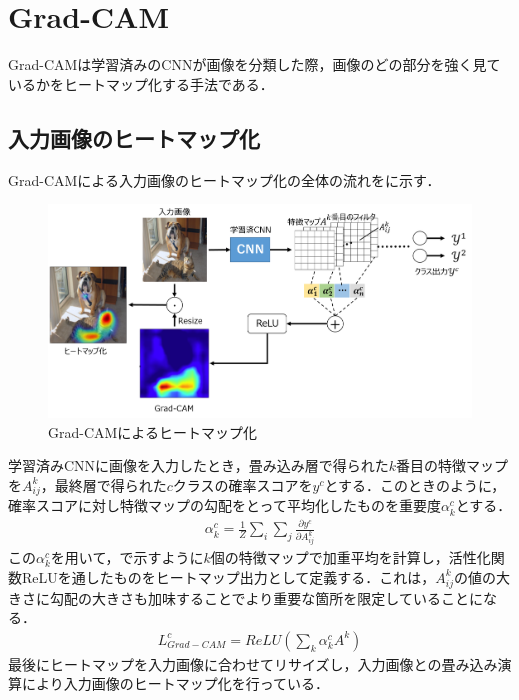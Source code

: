 \section{Grad-CAM}
Grad-CAMは学習済みのCNNが画像を分類した際，画像のどの部分を強く見ているかをヒートマップ化する手法である\cite{gradcam}．

\subsection{入力画像のヒートマップ化}
Grad-CAMによる入力画像のヒートマップ化の全体の流れをに示す．
\begin{figure}[htbp]
	\begin{center}
		\includegraphics[scale=0.492]{./images/old-study/gradcam.png}
		\caption{Grad-CAMによるヒートマップ化}
		\label{fig:gradcam}
	\end{center}
\end{figure}

学習済みCNNに画像を入力したとき，畳み込み層で得られた$k$番目の特徴マップを$A^{k}_{ij}$，最終層で得られた$c$クラスの確率スコアを$y^c$とする．このときのように，確率スコアに対し特徴マップの勾配をとって平均化したものを重要度$\alpha^c_k$とする．
\begin{align}
	\alpha^c_k = \frac{1}{Z} \sum_i \sum_j \frac {\partial y^c}{\partial A^k_{ij}} \label{eq:gradcam-weight}
\end{align}
この$\alpha^c_k$を用いて，で示すように$k$個の特徴マップで加重平均を計算し，活性化関数ReLUを通したものをヒートマップ出力として定義する．これは，$A^k_{ij}$の値の大きさに勾配の大きさも加味することでより重要な箇所を限定していることになる．
\begin{align}
	L^c_{Grad-CAM} = ReLU(\sum_k \alpha^c_k A^k) \label{eq:gradcam-heatmap}
\end{align}
最後にヒートマップを入力画像に合わせてリサイズし，入力画像との畳み込み演算により入力画像のヒートマップ化を行っている．


